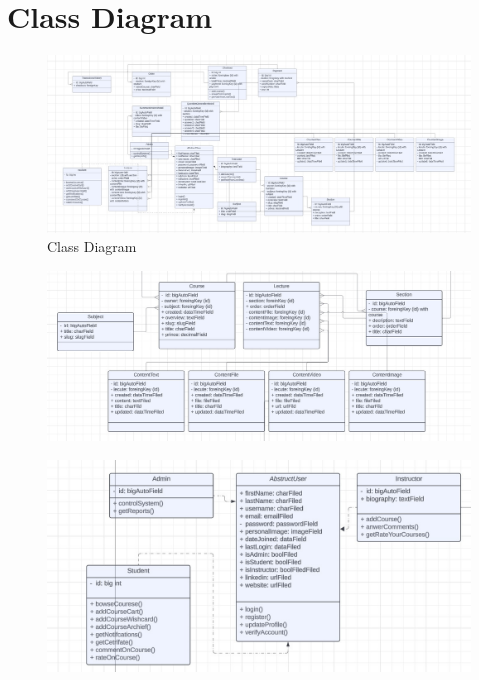 \newpage

\section{Class Diagram}
\begin{figure}[h!]
	\centering
	\includegraphics[width=\textwidth]{figures/class-diagram.jpeg}
	\caption{Class Diagram}
\end{figure}

\begin{figure}[h!]
	\centering
	\includegraphics[width=\textwidth]{figures/class-course.jpeg}
\end{figure}

\begin{figure}[h!]
	\centering
	\includegraphics[width=\textwidth]{figures/class-users.jpeg}
\end{figure}

